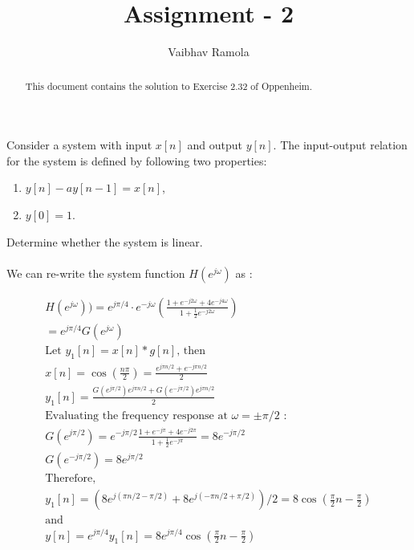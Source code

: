\documentclass[journal,12pt,twocolumn]{IEEEtran}
\renewcommand\thesection{\arabic{section}}
\begin{document}
\def\rightbox#1{\makebox[0in][r]{#1}}
\def\centbox#1{\makebox[0in]{#1}}
\def\topbox#1{\raisebox{-\baselineskip}[0in][0in]{#1}}
\def\midbox#1{\raisebox{-0.5\baselineskip}[0in][0in]{#1}}
\vspace{3cm}
\title{Assignment - 2}
\author{Vaibhav Ramola} 
\maketitle
\bigskip
\begin{abstract}
	This document contains the solution to Exercise 2.32 of Oppenheim.
\end{abstract}

\problem  Consider a system with input $x[n]$ and output $y[n]$. The input-output relation for the system is defined by following two properties:\\
\begin{enumerate}
	\item 	$y[n] - ay[n-1] = x[n]$,
	\item 	$y[0] = 1$.
\end{enumerate}



Determine whether the system is linear.
\\
\solution\\ 
We can re-write the system function $H(e^{j\omega})$ as :\\
\begin{flushleft}
	\begin{align*}
	H(e^{j\omega})) = e^{j\pi/4} \cdot e^{-j\omega} \left( \frac{1 + e^{-j2\omega} + 4e^{-j4\omega}}{1 + \frac{1}{2}e^{-j2\omega}} \right) \\
	= e^{j\pi/4}G(e^{j\omega})\\
	\text{Let $y_{1}[n] = x[n] * g[n]$, then}\\
	x[n] = \cos(\frac{n\pi}{2}) = \frac{e^{j\pi n/2} + e^{-j\pi n/2}}{2}\\
	y_{1}[n] = \frac{G(e^{j\pi/2})e^{j\pi n/2} + G(e^{-j\pi/2}) e^{j\pi n/2} }{2}\\
	\text{Evaluating the frequency response at $\omega = \pm \pi/2$ : }\\
	G(e^{j\pi/2}) = e^{-j\pi/2} \frac{1 + e^{-j\pi} + 4e^{-j2\pi}}{1 + \frac{1}{2} e^{-j\pi}} = 8e^{-j\pi/2}\\
	G(e^{-j\pi/2}) = 8e^{j\pi/2}\\
	\text{Therefore,}\\y_{1}[n] = (8 e^{j(\pi n/2 - \pi/2)} + 8e^{j(-\pi n/2 + \pi/2)})/2 = 8\cos(\frac{\pi}{2}n - \frac{\pi}{2})\\
	\text{and}\\
	y[n] = e^{j \pi/4}y_{1}[n] = 8e^{j\pi/4}\cos(\frac{\pi}{2}n - \frac{\pi}{2})\\ 
	\end{align*}
\end{flushleft}
\end{document}
